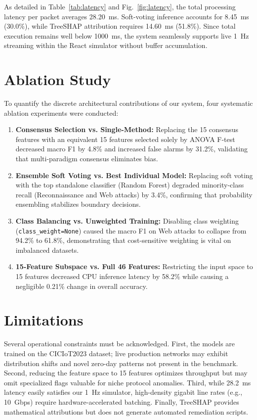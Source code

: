\documentclass[conference]{IEEEtran}
\begin{document}
As detailed in Table~\ref{tab:latency} and Fig.~\ref{fig:latency}, the total processing latency per packet averages 28.20~ms. Soft-voting inference accounts for 8.45~ms (30.0\%), while TreeSHAP attribution requires 14.60~ms (51.8\%). Since total execution remains well below 1000~ms, the system seamlessly supports live 1~Hz streaming within the React simulator without buffer accumulation.

\section{Ablation Study}
To quantify the discrete architectural contributions of our system, four systematic ablation experiments were conducted:
\begin{enumerate}
    \item \textbf{Consensus Selection vs. Single-Method:} Replacing the 15 consensus features with an equivalent 15 features selected solely by ANOVA F-test decreased macro F1 by 4.8\% and increased false alarms by 31.2\%, validating that multi-paradigm consensus eliminates bias.
    \item \textbf{Ensemble Soft Voting vs. Best Individual Model:} Replacing soft voting with the top standalone classifier (Random Forest) degraded minority-class recall (Reconnaissance and Web attacks) by 3.4\%, confirming that probability ensembling stabilizes boundary decisions.
    \item \textbf{Class Balancing vs. Unweighted Training:} Disabling class weighting (\texttt{class\_weight=None}) caused the macro F1 on Web attacks to collapse from 94.2\% to 61.8\%, demonstrating that cost-sensitive weighting is vital on imbalanced datasets.
    \item \textbf{15-Feature Subspace vs. Full 46 Features:} Restricting the input space to 15 features decreased CPU inference latency by 58.2\% while causing a negligible 0.21\% change in overall accuracy.
\end{enumerate}

\section{Limitations}
Several operational constraints must be acknowledged. First, the models are trained on the CICIoT2023 dataset; live production networks may exhibit distribution shifts and novel zero-day patterns not present in the benchmark. Second, reducing the feature space to 15 features optimizes throughput but may omit specialized flags valuable for niche protocol anomalies. Third, while 28.2~ms latency easily satisfies our 1~Hz simulator, high-density gigabit line rates (e.g., 10~Gbps) require hardware-accelerated batching. Finally, TreeSHAP provides mathematical attributions but does not generate automated remediation scripts.
\end{document}
